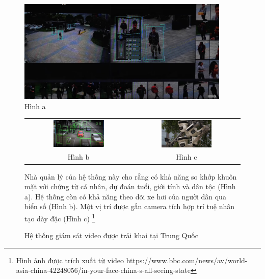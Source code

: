 \documentclass[a4paper]{report}
\begin{document}
\begin{figure}[h] \label{fig:three-alternative-operations}
	\centering
	\includegraphics[width=0.9\textwidth]{1_01.png}\\
	Hình a\\
	\color{black}
	\begin{tabular}{cc}
		\\
		\includegraphics[width=0.5\textwidth]{1_02.png} &
		\includegraphics[width=0.49\textwidth]{1_03.png} \\
		
		Hình b & Hình c
	\end{tabular}

	\caption{Hệ thống giám sát video được trải khai tại Trung Quốc} Nhà quản lý của hệ thống này cho rằng có khả năng so khớp khuôn mặt với
	chứng từ cá nhân, dự đoán tuổi, giới tính và dân tộc (Hình a). Hệ thống còn có khả năng theo dõi xe hơi của người dân qua biển số (Hình b). 
	Một vị trí được gắn camera tích hợp trí tuệ nhân tạo dày đặc (Hình c) 
	\footnote{ Hình ảnh được trích xuất từ video https://www.bbc.com/news/av/world-asia-china-42248056/in-your-face-china-s-all-seeing-state}
\end{figure}	
\end{document}
